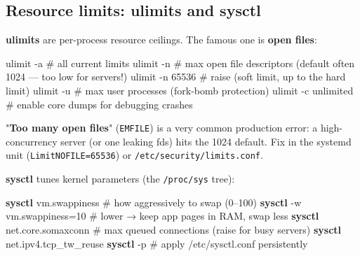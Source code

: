 \documentclass[11pt]{article}
\newenvironment{Shaded}{\begin{snugshade}}{\end{snugshade}}
\newcommand{\AttributeTok}[1]{\textcolor[rgb]{0.16,0.50,0.73}{#1}}
\newcommand{\BuiltInTok}[1]{\textcolor[rgb]{0.50,0.55,0.55}{#1}}
\newcommand{\CommentTok}[1]{\textcolor[rgb]{0.48,0.49,0.49}{#1}}
\newcommand{\ExtensionTok}[1]{\textcolor[rgb]{0.00,0.60,1.00}{\textbf{#1}}}
\newcommand{\NormalTok}[1]{\textcolor[rgb]{0.81,0.81,0.76}{#1}}
\begin{document}
\subsection{Resource limits: ulimits and sysctl}\label{resource-limits-ulimits-and-sysctl}

\textbf{ulimits} are per-process resource ceilings. The famous one is \textbf{open files}:


\begin{Shaded}
\begin{Highlighting}[]
\BuiltInTok{ulimit} \AttributeTok{{-}a}               \CommentTok{\# all current limits}
\BuiltInTok{ulimit} \AttributeTok{{-}n}               \CommentTok{\# max open file descriptors (default often 1024 — too low for servers!)}
\BuiltInTok{ulimit} \AttributeTok{{-}n}\NormalTok{ 65536         }\CommentTok{\# raise (soft limit, up to the hard limit)}
\BuiltInTok{ulimit} \AttributeTok{{-}u}               \CommentTok{\# max user processes (fork{-}bomb protection)}
\BuiltInTok{ulimit} \AttributeTok{{-}c}\NormalTok{ unlimited     }\CommentTok{\# enable core dumps for debugging crashes}
\end{Highlighting}
\end{Shaded}

"\textbf{Too many open files}" (\texttt{EMFILE}) is a very common production error: a high-concurrency server (or one leaking fds) hits the 1024 default. Fix in the systemd unit (\texttt{LimitNOFILE=65536}) or \texttt{/etc/security/limits.conf}.

\textbf{sysctl} tunes kernel parameters (the \texttt{/proc/sys} tree):


\begin{Shaded}
\begin{Highlighting}[]
\ExtensionTok{sysctl}\NormalTok{ vm.swappiness                    }\CommentTok{\# how aggressively to swap (0–100)}
\ExtensionTok{sysctl} \AttributeTok{{-}w}\NormalTok{ vm.swappiness=10              }\CommentTok{\# lower → keep app pages in RAM, swap less}
\ExtensionTok{sysctl}\NormalTok{ net.core.somaxconn               }\CommentTok{\# max queued connections (raise for busy servers)}
\ExtensionTok{sysctl}\NormalTok{ net.ipv4.tcp\_tw\_reuse}
\ExtensionTok{sysctl} \AttributeTok{{-}p}                               \CommentTok{\# apply /etc/sysctl.conf persistently}
\end{Highlighting}
\end{Shaded}
\end{document}
